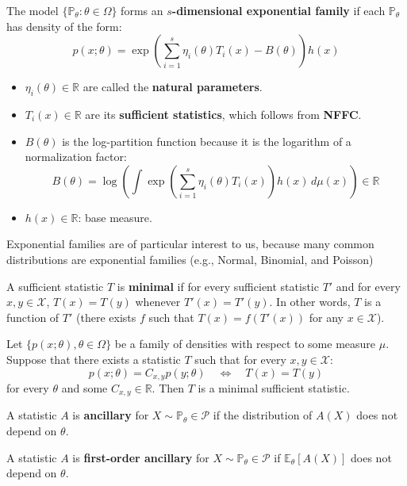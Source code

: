 \begin{exam}
    The model $\{\mathbb{P}_\theta : \theta \in \Omega\}$ forms an \textbf{$s$-dimensional exponential family} if each $\mathbb{P}_\theta$ has density of the form:
    \[
    p(x; \theta) = \exp\left( \sum_{i=1}^{s} \eta_i(\theta) T_i(x) - B(\theta) \right) h(x)
    \]
    \begin{itemize}
        \item $\eta_i(\theta) \in \mathbb{R}$ are called the \textbf{natural parameters}.
        \item $T_i(x) \in \mathbb{R}$ are its \textbf{sufficient statistics}, which follows from \textbf{NFFC}.
        \item $B(\theta)$ is the log-partition function because it is the logarithm of a normalization factor:
        \[
        B(\theta) = \log\left( \int \exp\left( \sum_{i=1}^{s} \eta_i(\theta) T_i(x) \right) h(x)\, d\mu(x) \right) \in \mathbb{R}
        \]
        \item $h(x) \in \mathbb{R}$: base measure.
    \end{itemize}
    Exponential families are of particular interest to us, because many common distributions are exponential families (e.g., Normal, Binomial, and Poisson)
\end{exam}
\begin{defn}
A sufficient statistic $T$ is \textbf{minimal} if for every sufficient statistic $T'$ and for every $x, y \in \mathcal{X}$, $T(x) = T(y)$ whenever $T'(x) = T'(y)$. In other words, $T$ is a function of $T'$ (there exists $f$ such that $T(x) = f(T'(x))$ for any $x \in \mathcal{X}$).
\end{defn}

\begin{thm}
Let $\{p(x; \theta), \theta \in \Omega\}$ be a family of densities with respect to some measure $\mu$. Suppose that there exists a statistic $T$ such that for every $x, y \in \mathcal{X}$:
\[
p(x; \theta) = C_{x,y} p(y; \theta) \quad \Longleftrightarrow \quad T(x) = T(y)
\]
for every $\theta$ and some $C_{x,y} \in \mathbb{R}$. Then $T$ is a minimal sufficient statistic.
\end{thm}

\begin{defn}[Ancillary]
A statistic $A$ is \textbf{ancillary} for $X \sim \mathbb{P}_\theta \in \mathcal{P}$ if the distribution of $A(X)$ does not depend on $\theta$.
\end{defn}

\begin{defn}
A statistic $A$ is \textbf{first-order ancillary} for $X \sim \mathbb{P}_\theta \in \mathcal{P}$ if $\mathbb{E}_\theta[A(X)]$ does not depend on $\theta$.
\end{defn}


